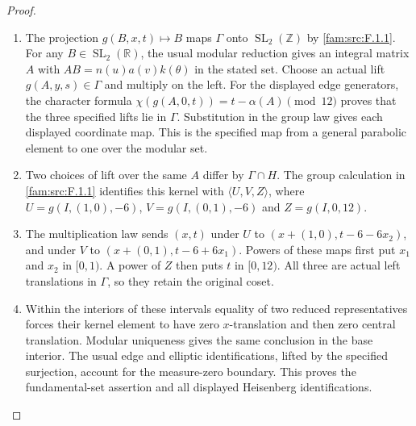 \begin{proof}
\begin{enumerate}[label=\arabic*.,leftmargin=*]
\item The projection $g(B,x,t)\mapsto B$ maps $\Gamma$
onto $\operatorname{SL}_2(\mathbb Z)$ by
\ref{fam:src:F.1.1}. For any $B\in\operatorname{SL}_2(\mathbb R)$,
the usual modular reduction gives an integral matrix $A$
with $AB=n(u)a(v)k(\theta)$ in the stated set. Choose an
actual lift $g(A,y,s)\in\Gamma$ and multiply on the left.
For the displayed edge generators, the character formula
$\chi(g(A,0,t))=t-\alpha(A)\pmod {12}$ proves that the
three specified lifts lie in $\Gamma$. Substitution in
the group law gives each displayed coordinate map.
This is the specified map from a general parabolic element
to one over the modular set.
\item Two choices of lift over the same $A$ differ by
$\Gamma\cap H$. The group calculation in
\ref{fam:src:F.1.1} identifies this kernel with
$\langle U,V,Z\rangle$, where
$U=g(I,(1,0),-6)$, $V=g(I,(0,1),-6)$ and
$Z=g(I,0,12)$.
\item The multiplication law sends $(x,t)$ under $U$
to $(x+(1,0),t-6-6x_2)$, and under $V$ to
$(x+(0,1),t-6+6x_1)$. Powers of these maps first put
$x_1$ and $x_2$ in $[0,1)$. A power of $Z$ then puts
$t$ in $[0,12)$. All three are actual left translations
in $\Gamma$, so they retain the original coset.
\item Within the interiors of these intervals equality
of two reduced representatives forces their kernel
element to have zero $x$-translation and then zero
central translation. Modular uniqueness gives the same
conclusion in the base interior. The usual edge and
elliptic identifications, lifted by the specified
surjection, account for the measure-zero boundary.
This proves the fundamental-set assertion and all
displayed Heisenberg identifications.
\end{enumerate}
\end{proof}
